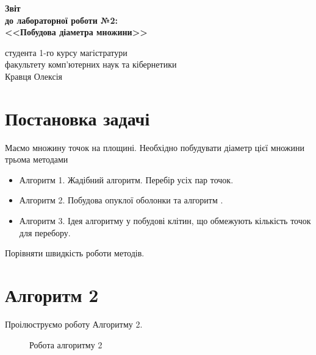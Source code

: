 \documentclass[a4paper,12pt]{article}
\begin{document}
	
	\begin{titlepage}
		\vspace*{6cm}
		\begin{center}
			
			\large
			\textbf{Звіт}\\
			\textbf{до лабораторної роботи №2:}\\
			\textbf{<<Побудова діаметра множини>>}
			
		\end{center}
		
		\vspace{8cm}
		\begin{flushright}
			студента 1-го курсу магістратури\\
			факультету комп'ютерних наук та кібернетики\\
			Кравця Олексія
		\end{flushright}
		
	\end{titlepage}

\newpage
\tableofcontents
\newpage
\section{Постановка задачі}

Маємо множину точок на площині. Необхідно побудувати діаметр цієї множини трьома методами

\begin{itemize}
	\item Алгоритм 1. Жадібний алгоритм. Перебір усіх пар точок.
	\item Алгоритм 2. Побудова опуклої оболонки та алгоритм \cite[\textit{Rotating calipers}]{Rotating calipers}.
	\item Алгоритм 3. Ідея \cite{Cells} алгоритму у побудові клітин, що обмежують кількість точок для перебору.
\end{itemize}

Порівняти швидкість роботи методів.

\section{Алгоритм 2}

Проілюструємо роботу Алгоритму 2.

\begin{figure}[h]
	\caption{Робота алгоритму 2}
	\label{fig:f1}
\end{figure}
\end{document}
